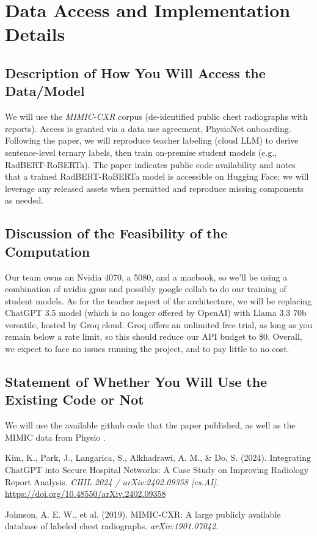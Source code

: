 \documentclass[letterpaper]{article} %
\begin{document}
\section{Data Access and Implementation Details}

\subsection{Description of How You Will Access the Data/Model}
We will use the \emph{MIMIC-CXR} corpus (de-identified public chest radiographs with reports). Access is granted via a data use agreement, PhysioNet onboarding. Following the paper, we will reproduce teacher labeling (cloud LLM) to derive sentence-level ternary labels, then train on-premise student models (e.g., RadBERT-RoBERTa). The paper indicates public code availability and notes that a trained RadBERT-RoBERTa model is accessible on Hugging Face; we will leverage any released assets when permitted and reproduce missing components as needed.

\subsection{Discussion of the Feasibility of the Computation}
Our team owns an Nvidia 4070, a 5080, and a macbook, so we'll be using a combination of nvidia gpus and possibly google collab to do our training of student models.  As for the teacher aspect of the architecture, we will be replacing ChatGPT 3.5 model (which is no longer offered by OpenAI) with Llama 3.3 70b versatile, hosted by Groq cloud.  Groq offers an unlimited free trial, as long as you remain below a rate limit, so this should reduce our API budget to \$0.  Overall, we expect to face no issues running the project, and to pay little to no cost.

\subsection{Statement of Whether You Will Use the Existing Code or Not}
We will use the available github code that the paper published, as well as the MIMIC data from Physio \cite{mimiccxr}.



\begin{thebibliography}{9}

Kim, K., Park, J., Langarica, S., Alkhadrawi, A. M., \& Do, S. (2024).
\newblock Integrating ChatGPT into Secure Hospital Networks: A Case Study on Improving Radiology Report Analysis.
\newblock \emph{CHIL 2024 / arXiv:2402.09358 [cs.AI]}. 
\newblock \url{https://doi.org/10.48550/arXiv.2402.09358}

Johnson, A. E. W., et al. (2019).
\newblock MIMIC-CXR: A large publicly available database of labeled chest radiographs.
\newblock \emph{arXiv:1901.07042}.

\end{thebibliography}
\end{document}
